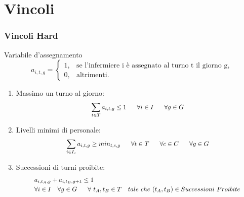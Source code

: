 \documentclass[xcolor={dvipsnames, table}]{beamer}
\newcommand\scalemath[2]{\scalebox{#1}{\mbox{\ensuremath{\displaystyle #2}}}}
\begin{document}
\section{Vincoli}
\begin{frame}
	\frametitle{Vincoli Hard}
			\begin{block}{Variabile d'assegnamento}
			\begin{equation*}
						a_{i, t, g}=
						\begin{cases}
						1, & \text{se l'infermiere i è assegnato al turno t il giorno g,} 	\\
						0, & \text{altrimenti.}
						\end{cases}
				\end{equation*}
			\end{block}					
				\begin{enumerate}
				\item Massimo un turno al giorno:
				\begin{equation*}
						\scalemath{0.9}{
						\begin{aligned}
						\sum_{t \in T} a_{i, t, g} \leq 1 ~~~~~ \forall i \in I ~~~~~ \forall g \in G			
						\end{aligned}
						}
						\end{equation*}
				\item Livelli minimi di personale:
				\begin{equation*}
				\scalemath{0.9}{
				\begin{aligned}
				\sum_{i \in I_c} a_{i,t,g} \geq min_{t,c,g} ~~~~~ \forall t 	\in T ~~~~~ \forall c \in C ~~~~~ \forall g \in G
				\end{aligned}
				}
				\end{equation*}
				\item Successioni di turni proibite: 
				\begin{equation*}
				\scalemath{0.9}{
				\begin{aligned}
				&a_{i, t_{A}, g} + a_{i, t_{B}, g+1} \leq 1 \\
				&\forall i \in I ~~~ \forall g \in G ~~~~~ \forall ~ 								t_{A}, t_{B} \in T ~~~ tale ~ che ~ (t_{A}, t_{B}) \in Successioni~Proibite \\
				\end{aligned}
				}
			\end{equation*}
				
				\end{enumerate}
			
\end{frame}
\end{document}
